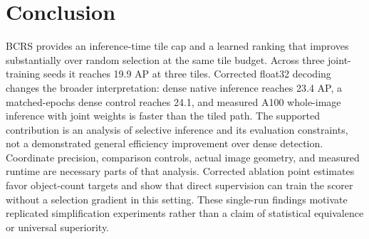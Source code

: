 \documentclass[conference]{IEEEtran}
\begin{document}
\section{Conclusion}
BCRS provides an inference-time tile cap and a learned ranking that improves substantially over random selection at the same tile budget. Across three joint-training seeds it reaches 19.9 AP at three tiles. Corrected float32 decoding changes the broader interpretation: dense native inference reaches 23.4 AP, a matched-epochs dense control reaches 24.1, and measured A100 whole-image inference with joint weights is faster than the tiled path. The supported contribution is an analysis of selective inference and its evaluation constraints, not a demonstrated general efficiency improvement over dense detection. Coordinate precision, comparison controls, actual image geometry, and measured runtime are necessary parts of that analysis. Corrected ablation point estimates favor object-count targets and show that direct supervision can train the scorer without a selection gradient in this setting. These single-run findings motivate replicated simplification experiments rather than a claim of statistical equivalence or universal superiority.



\end{document}
